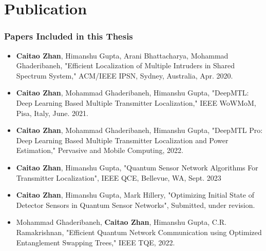 \chapter{Publication}

\subsection*{Papers Included in this Thesis}
\begin{itemize}
    \item \textbf{Caitao Zhan}, Himanshu Gupta, Arani Bhattacharya, Mohammad Ghaderibaneh, "Efficient Localization of Multiple Intruders in Shared Spectrum System," ACM/IEEE IPSN, Sydney, Australia, Apr. 2020.

    \item \textbf{Caitao Zhan}, Mohammad Ghaderibaneh, Himanshu Gupta, "DeepMTL: Deep Learning Based Multiple Transmitter Localization," IEEE WoWMoM, Pisa, Italy, June. 2021. 

    \item \textbf{Caitao Zhan}, Mohammad Ghaderibaneh, Himanshu Gupta, "DeepMTL Pro: Deep Learning Based Multiple Transmitter Localization and Power Estimation," Pervasive and Mobile Computing, 2022.

    \item \textbf{Caitao Zhan}, Himanshu Gupta, "Quantum Sensor Network Algorithms For Transmitter Localization", IEEE QCE, Bellevue, WA, Sept. 2023
    
    \item \textbf{Caitao Zhan}, Himanshu Gupta, Mark Hillery, "Optimizing Initial State of Detector Sensors in Quantum Sensor Networks", Submitted, under revision.

    \item Mohammad Ghaderibaneh, \textbf{Caitao Zhan}, Himanshu Gupta, C.R. Ramakrishnan, "Efficient Quantum Network Communication using Optimized Entanglement Swapping Trees," IEEE TQE, 2022.


\end{itemize}

